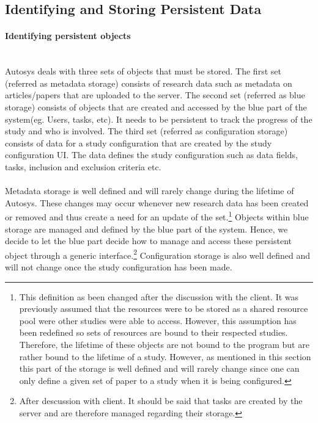 \subsection{Identifying and Storing Persistent Data}
\paragraph{Identifying persistent objects}\mbox{}\\

Autosys deals with three sets of objects that must be stored.  The first set (referred as metadata storage) consists of research data such as metadata on articles/papers that are uploaded to the server. The second set (referred as blue storage) consists of objects that are created and accessed by the blue part of the system(eg. Users, tasks, etc). It needs to be persistent to track the progress of the study and who is involved. The third set (referred as configuration storage) consists of data for a study configuration that are created by the study configuration UI. The data defines the study configuration such as data fields, tasks, inclusion and exclusion criteria etc.\\\\ 

Metadata storage is well defined and will rarely change during the lifetime of Autosys. These changes may occur whenever new research data has been created or removed and thus create a need for an update of the set.\footnote{This definition as been changed after the discussion with the client. It was previously assumed that the resources were to be stored as a shared resource pool were other studies were able to access. However, this assumption has been redefined so sets of resources are bound to their respected studies.  Therefore, the lifetime of these objects are not bound to the program but are rather bound to the lifetime of a study.  However, as mentioned in this section this part of the storage is well defined and will rarely change since one can only define a given set of paper to a study when it is being configured. } Objects within blue storage are managed and defined by the blue part of the system. Hence, we decide to let the blue part decide how to manage and access these persistent object through a generic interface.\footnote{After descussion with client. It should be said that tasks are created by the server and are therefore managed regarding their storage.} Configuration storage is also well defined and will not change once the study configuration has been made.

